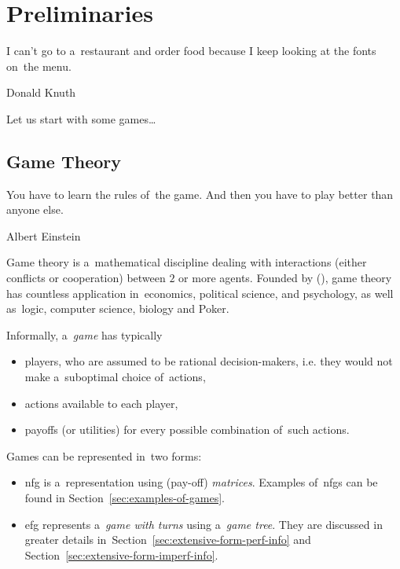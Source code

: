 \chapter{Preliminaries}
\epigraph{
  I can't go to a~restaurant and order food because I keep looking at the fonts on~the menu.
}{Donald Knuth}
Let us start with some games\ldots

\section{Game Theory}
\epigraph{
  You have to learn the rules of~the game.
  And then you have to play better than anyone else.
}{Albert Einstein}
Game theory is a~mathematical discipline dealing with interactions (either conflicts or cooperation) between $2$ or more agents.
Founded by (\cite{VonNeumann1953theory}), game theory has countless application in~economics, political science, and psychology, as well as~logic, computer science, biology and Poker.

Informally, a~\emph{game} has typically
\begin{itemize}
  \item players, who are assumed to be rational decision-makers, i.e. they would not make a~suboptimal choice of~actions,
  \item actions available to each player,
  \item payoffs (or utilities) for every possible combination of~such actions.
\end{itemize}

Games can be represented in~two forms:
\begin{itemize}
  \item \acrfull{nfg} is a~representation using (pay-off) \emph{matrices}.
    Examples of~\acrshort{nfg}s can be found in Section~\ref{sec:examples-of-games}.
  \item \acrfull{efg} represents a~\emph{game with turns} using a~\emph{game tree}.
    They are discussed in greater details in~Section~\ref{sec:extensive-form-perf-info} and Section~\ref{sec:extensive-form-imperf-info}.
\end{itemize}


